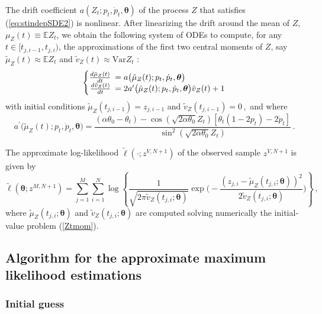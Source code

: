 \documentclass[11pt]{article}
\theoremstyle{definition}
\begin{document}
The drift coefficient $a(Z_t; p_t, \dot{p}_t, \bm{\theta}) $ of the process $Z$ that satisfies (\ref{eq:stindepSDE2}) is nonlinear. After linearizing the drift around the mean of $Z$, $\mu_Z(t) \equiv \mathbb{E}Z_t$,  we obtain the following system of ODEs to compute, for any $t\in [t_{j,i-1}, t_{j, i})$, the approximations of the first two central moments of $Z$, say  $\tilde{\mu}_Z(t) \approx \mathbb{E}Z_t$ and $\tilde{v}_Z(t) \approx \text{Var} Z_t$ :\\
\begin{equation}
  \left\{
  \begin{array}{@{}rl@{}}
    \frac{d \tilde{\mu}_Z (t)}{dt} \!\!\!&=  a\big( \tilde{\mu}_Z (t) ; p_t, \dot{p}_t, \bm{\theta} \big)   \\
    \frac{d \tilde{v}_Z (t)}{dt}  \!\!\!&= 2  a^{\prime} \big( \tilde{\mu}_Z (t) ; p_t, \dot{p}_t, \bm{\theta} \big) \tilde{v}_Z (t) + 1
 \end{array}\right.  \label{Ztmom}
\end{equation}
with initial conditions $\tilde{\mu}_Z(t_{j,i-1})= z_{j, i-1}$ and $\tilde{v}_Z(t_{j,i-1})= 0 \,,$ and where 
\begin{equation*}
a^{\prime} \big( \tilde{\mu}_Z (t) ; p_t, \dot{p}_t, \bm{\theta} \big) =    \frac{  (\alpha \theta_0 - \theta_t)  - \cos(\sqrt{2 \alpha \theta_0 } Z_t) [ \theta_t (1 - 2 p_t) - 2  \dot{p}_t ] }{\sin^2{(\sqrt{2 \alpha \theta_0} Z_t)}} \,.
\end{equation*}

The approximate log-likelihood $\tilde{\ell}(\cdot ; z^{V, N+1})$ of the observed sample $z^{V, N+1}$ is given by
\begin{equation}
\tilde{\ell} (\bm{\theta}; z^{M,N +1}) = \sum_{j=1}^M \sum_{i=1}^N \log \left\{ \frac{1}{\sqrt{2 \pi \tilde{v}_Z(t_{j,i}; \bm{\theta})}} \exp \Bigg( -\frac{(z_{j,i} - \tilde{\mu}_Z(t_{j,i};\bm{\theta} ))^2}{2 \tilde{v}_Z(t_{j,i}; \bm{\theta})} \Bigg) \right\}   \,,   \label{loglikelihoodZ}
\end{equation}
where $\tilde{\mu}_Z(t_{j,i};\bm{\theta} )$ and $\tilde{v}_Z(t_{j,i};\bm{\theta} )$ are computed solving numerically the initial-value problem (\ref{Ztmom}). 

\subsection{Algorithm for the approximate maximum likelihood estimations} \label{opt_sec}

\subsubsection{Initial guess}
\end{document}
